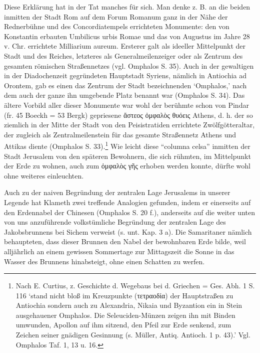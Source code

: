 \documentclass[a4paper, 11pt, oneside]{article}
\begin{document}
Diese Erklärung hat in der Tat manches für sich. Man denke z. B. an die beiden inmitten der Stadt Rom auf dem Forum Romanum ganz in der Nähe der Rednerbühne und des Concordiatempels errichteten Monumente: den von Konstantin erbauten Umbilicus urbis Romae und das von Augustus im Jahre 28 v. Chr. errichtete Milliarium aureum. Ersterer galt als ideeller Mittelpunkt der Stadt und des Reiches, letzteres als Generalmeilenzeiger oder als Zentrum des gesamten römischen Straßennetzes (vgl. Omphalos S. 35). Auch in der gewaltigen in der Diadochenzeit gegründeten Hauptstadt Syriens, nämlich in Antiochia ad Orontem, gab es einen das Zentrum der Stadt bezeichnenden `Omphalos,' nach dem auch der ganze ihn umgebende Platz benannt war (Omphalos S. 34). Das ältere Vorbild aller dieser Monumente war wohl der berühmte schon von Pindar (fr. 45 Boeckh = 53 Bergk) gepriesene ἄστεος ὀμφαλὸς θυόεις Athens, d. h. der so ziemlich in der Mitte der Stadt von den Peisistratiden errichtete Zwölfgötteraltar, der zugleich als Zentralmeilenstein für das gesamte Straßennetz Athens und Attikas diente (Omphalos S. 33).\footnote{Nach E. Curtius, z. Geschichte d. Wegebaus bei d. Griechen = Ges. Abh. 1 S. 116 `stand nicht bloß im Kreuzpunkte (τετραοδία) der Hauptstraßen zu Antiochia sondern auch zu Alexandria, Nikaia und Byzantion ein in Stein ausgehauener Omphalos. Die Seleuciden-Münzen zeigen ihn mit Binden umwunden, Apollon auf ihm sitzend, den Pfeil zur Erde senkend, zum Zeichen seiner gnädigen Gesinnung (s. Müller, Antiq. Antioch. 1 p. 43).' Vgl. Omphalos Taf. 1, 13 u. 16.} Wie leicht diese "`columna celsa"' inmitten der Stadt Jerusalem von den späteren Bewohnern, die sich rühmten, im Mittelpunkt der Erde zu wohnen, auch zum ὀμφαλὸς γῆς erhoben werden konnte, dürfte wohl ohne weiteres einleuchten.

Auch zu der naiven Begründung der zentralen Lage Jerusalems in unserer Legende hat Klameth zwei treffende Analogien gefunden, indem er einerseits auf den Erdennabel der Chinesen (Omphalos S. 20 f.), anderseits auf die weiter unten von uns anzuführende volkstümliche Begründung der zentralen Lage des Jakobsbrunnens bei Sichem verweist (s. unt. Kap. 3 a). Die Samaritaner nämlich behaupteten, dass dieser Brunnen den Nabel der bewohnbaren Erde bilde, weil alljährlich an einem gewissen Sommertage zur Mittagszeit die Sonne in das Wasser des Brunnens hinabsteigt, ohne einen Schatten zu werfen.
\end{document}
